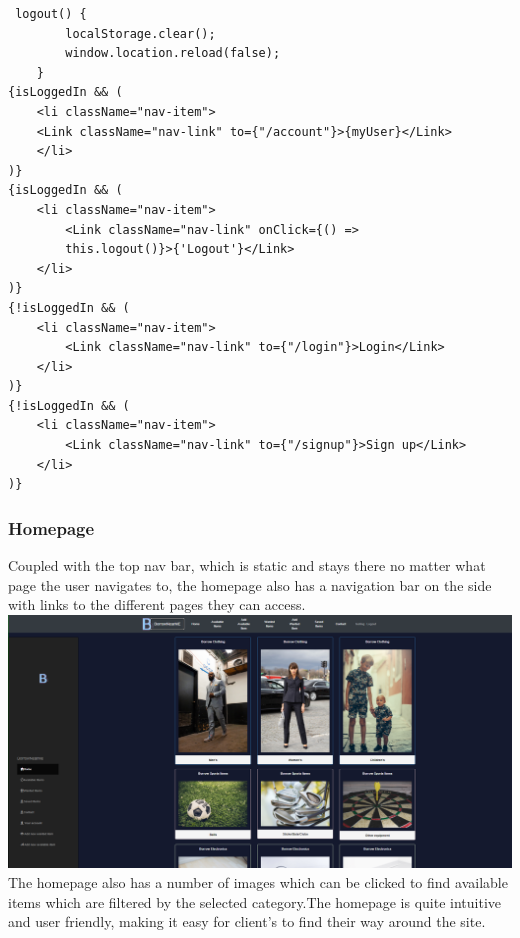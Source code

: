 \begin{verbatim}
 logout() {
        localStorage.clear();
        window.location.reload(false);
    }
{isLoggedIn && (
    <li className="nav-item">
    <Link className="nav-link" to={"/account"}>{myUser}</Link>
    </li>
)}
{isLoggedIn && (
    <li className="nav-item">
        <Link className="nav-link" onClick={() => 
        this.logout()}>{'Logout'}</Link>
    </li>
)}
{!isLoggedIn && (
    <li className="nav-item">
        <Link className="nav-link" to={"/login"}>Login</Link>
    </li>
)}
{!isLoggedIn && (
    <li className="nav-item">
        <Link className="nav-link" to={"/signup"}>Sign up</Link>
    </li>
)}
\end{verbatim}

\subsubsection{Homepage}
Coupled with the top nav bar, which is static and stays there no matter what page the user navigates to, the homepage also has a navigation bar on the side with links to the different pages they can access.
\newline
\includegraphics[scale=0.3]{img/fe_homepage.PNG}
\newline
The homepage also has a number of images which can be clicked to find available items which are filtered by the selected category.The homepage is quite intuitive and user friendly, making it easy for client's to find their way around the site.  

